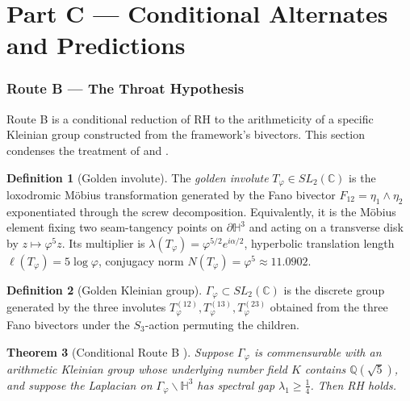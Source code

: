 \documentclass[11pt,a4paper]{article}
\theoremstyle{plain}
\newtheorem{theorem}{Theorem}[section]
\theoremstyle{definition}
\newtheorem{definition}[theorem]{Definition}
\theoremstyle{remark}
\numberwithin{equation}{section}
\providecommand{\C}{\mathbb{C}}
\providecommand{\Q}{\mathbb{Q}}
\providecommand{\Hh}{\mathbb{H}}
\providecommand{\vp}{\varphi}
\begin{document}
\part*{Part C --- Conditional Alternates and Predictions}

\section{Route B --- The Throat Hypothesis}
\label{sec:route-b}

Route B is a conditional reduction of RH to the arithmeticity of a
specific Kleinian group constructed from the framework's bivectors.
This section condenses the treatment of \cite[\S7]{echo-rh} and
\cite[\S7]{synthesis-paper}.

\begin{definition}[Golden involute]
\label{def:involute}
The \emph{golden involute} $T_\vp \in SL_2(\C)$ is the loxodromic
M\"obius transformation generated by the Fano bivector
$F_{12} = \eta_1 \wedge \eta_2$ exponentiated through the screw
decomposition.  Equivalently, it is the M\"obius element fixing
two seam-tangency points on $\partial \Hh^3$ and acting on a
transverse disk by $z \mapsto \vp^5 z$.  Its multiplier is
$\lambda(T_\vp) = \vp^{5/2} e^{i\alpha/2}$, hyperbolic translation
length $\ell(T_\vp) = 5 \log\vp$, conjugacy norm
$N(T_\vp) = \vp^5 \approx 11.0902$.
\end{definition}

\begin{definition}[Golden Kleinian group]
\label{def:gphi}
$\Gamma_\vp \subset SL_2(\C)$ is the discrete group generated by
the three involutes $T_\vp^{(12)}, T_\vp^{(13)}, T_\vp^{(23)}$
obtained from the three Fano bivectors under the $S_3$-action
permuting the children.
\end{definition}

\begin{theorem}[Conditional Route B {\cite[Thm.~7.4]{synthesis-paper}}]
\label{thm:route-b}
Suppose $\Gamma_\vp$ is commensurable with an arithmetic Kleinian
group whose underlying number field $K$ contains $\Q(\sqrt{5})$,
and suppose the Laplacian on
$\Gamma_\vp \backslash \Hh^3$ has spectral gap
$\lambda_1 \ge \tfrac14$.  Then RH holds.
\end{theorem}
\end{document}
